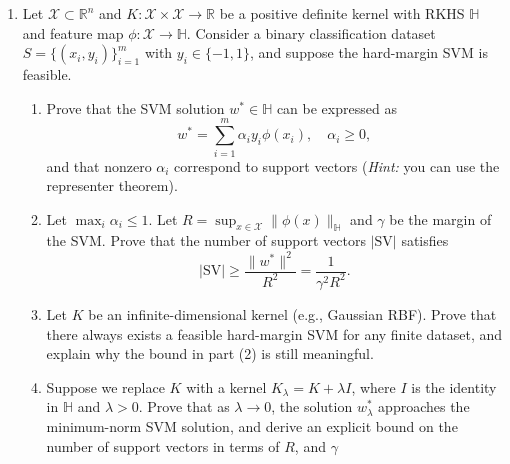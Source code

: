 \documentclass[letterpaper, 11pt]{article}
\newcommand{\1}{\mathds{1}}	%
\theoremstyle{definition}
\begin{document}
\begin{enumerate}
\item Let $\mathcal{X} \subset \mathbb{R}^n$ and $K: \mathcal{X} \times \mathcal{X} \to \mathbb{R}$ be a positive definite kernel with RKHS $\mathbb{H}$ and feature map $\phi: \mathcal{X} \to \mathbb{H}$. Consider a binary classification dataset $S = \{(x_i, y_i)\}_{i=1}^m$ with $y_i \in \{-1, 1\}$, and suppose the hard-margin SVM is feasible.

\begin{enumerate}
\item Prove that the SVM solution $w^* \in \mathbb{H}$ can be expressed as
\[
w^* = \sum_{i=1}^m \alpha_i y_i \phi(x_i), \quad \alpha_i \geq 0,
\]
and that nonzero $\alpha_i$ correspond to support vectors (\textit{Hint:} you can use the representer theorem).

\item Let $\max_i \alpha_i \leq 1$. Let $R = \sup_{x \in \mathcal{X}} \|\phi(x)\|_{\mathbb{H}}$ and $\gamma$ be the margin of the SVM. Prove that the number of support vectors $|\text{SV}|$ satisfies
\[
|\text{SV}| \geq \frac{\|w^*\|^2}{R^2} = \frac{1}{\gamma^2 R^2}.
\]

\item Let $K$ be an infinite-dimensional kernel (e.g., Gaussian RBF). Prove that there always exists a feasible hard-margin SVM for any finite dataset, and explain why the bound in part (2) is still meaningful.

\item Suppose we replace $K$ with a kernel $K_\lambda = K + \lambda I$, where $I$ is the identity in $\mathbb{H}$ and $\lambda > 0$. Prove that as $\lambda \to 0$, the solution $w_\lambda^*$ approaches the minimum-norm SVM solution, and derive an explicit bound on the number of support vectors in terms of $R$, and $\gamma$
\end{enumerate}
\end{enumerate}
\end{document}
